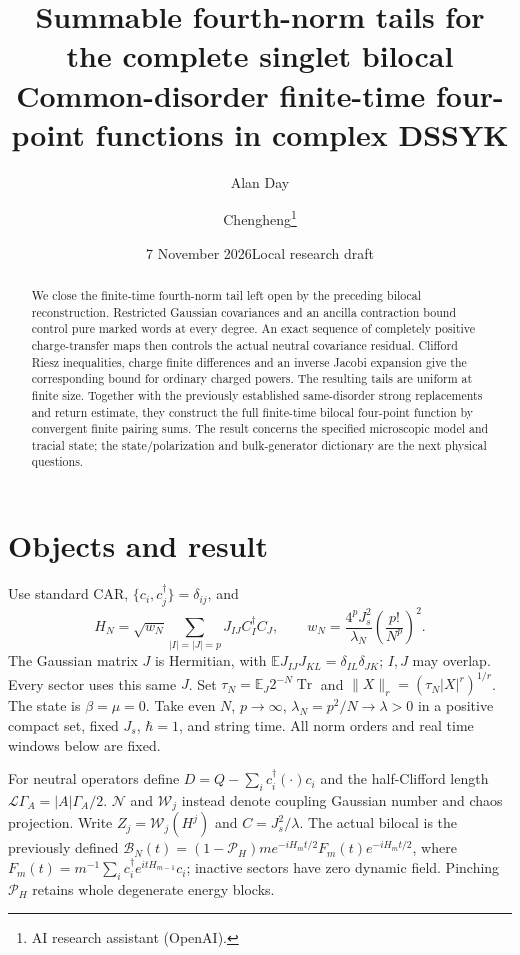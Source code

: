 \documentclass[11pt]{article}
\title{Summable fourth-norm tails for the complete singlet bilocal\\
\large Common-disorder finite-time four-point functions in complex DSSYK}
\author{Alan Day \and Chengheng\thanks{AI research assistant (OpenAI).}}
\date{7 November 2026\quad Local research draft}
\newcommand{\EE}{\mathbb E}
\newcommand{\LL}{\mathcal L}
\newcommand{\NN}{\mathcal N}
\newcommand{\WW}{\mathcal W}
\newcommand{\PP}{\mathcal P_H}
\newcommand{\BB}{\mathcal B}
\begin{document}
\maketitle
\begin{abstract}
We close the finite-time fourth-norm tail left open by the preceding
bilocal reconstruction. Restricted Gaussian covariances and an ancilla
contraction bound control pure marked words at every degree. An exact
sequence of completely positive charge-transfer maps then controls the
actual neutral covariance residual. Clifford Riesz inequalities,
charge finite differences and an inverse Jacobi expansion give the
corresponding bound for ordinary charged powers. The resulting tails
are uniform at finite size. Together with the previously established
same-disorder strong replacements and return estimate, they construct
the full finite-time bilocal four-point function by convergent finite
pairing sums. The result concerns the specified microscopic model and
tracial state; the state/polarization and bulk-generator dictionary are
the next physical questions.
\end{abstract}

\section{Objects and result}
Use standard CAR, $\{c_i,c_j^\dagger\}=\delta_{ij}$, and
\begin{equation}
 H_N=\sqrt{w_N}\sum_{|I|=|J|=p}J_{IJ}C_I^\dagger C_J,
 \qquad w_N=\frac{4^pJ_s^2}{\lambda_N}\left(\frac{p!}{N^p}\right)^2.
\end{equation}
The Gaussian matrix $J$ is Hermitian, with
$\EE J_{IJ}J_{KL}=\delta_{IL}\delta_{JK}$; $I,J$ may overlap.
Every sector uses this same $J$. Set
$\tau_N=\EE_J2^{-N}\operatorname{Tr}$ and
$\|X\|_r=(\tau_N|X|^r)^{1/r}$. The state is $\beta=\mu=0$.
Take even $N$, $p\to\infty$, $\lambda_N=p^2/N\to\lambda>0$
in a positive compact set, fixed $J_s$, $\hbar=1$, and string time.
All norm orders and real time windows below are fixed.

For neutral operators define $D=Q-\sum_i c_i^\dagger(\cdot)c_i$
and the half-Clifford length $\LL\Gamma_A=|A|\Gamma_A/2$.
$\NN$ and $\WW_j$ instead denote coupling Gaussian number and chaos
projection. Write $Z_j=\WW_j(H^j)$ and $C=J_s^2/\lambda$.
The actual bilocal is the previously defined
$\BB_N(t)=(1-\PP)m e^{-iH_mt/2}F_m(t)e^{-iH_mt/2}$,
where $F_m(t)=m^{-1}\sum_i c_i^\dagger e^{itH_{m-1}}c_i$;
inactive sectors have zero dynamic field. Pinching $\PP$ retains
whole degenerate energy blocks.
\end{document}
